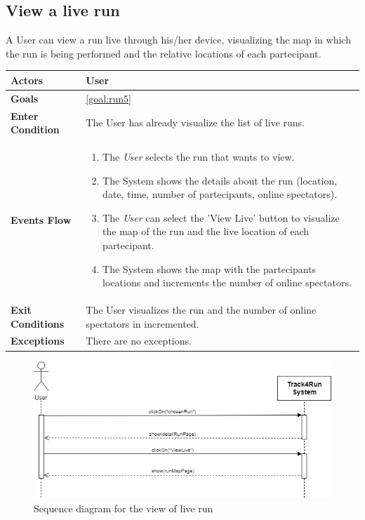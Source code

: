   \subsection{View a live run}
A User can view a run live through his/her device, visualizing the map in which the run is being performed and the relative locations of each partecipant.

\begin{table}[H]
	\centering
    
    \begin{tabular}{|p{3.5cm}|p{10.3cm}|}
    
    \hline
    \textbf{\large{Actors}} & User \\		 			
    \hline
    \textbf{\large{Goals}} 				& \ref{goal:run5}\\
    
    \hline
    \textbf{\large{Enter Condition}}	& The User has already visualize the list of live runs.\\
    
    \hline
    \textbf{\large{Events Flow}}		& \begin{enumerate}[leftmargin=0.5cm]
                                          	\item The \emph{User}  selects the run that wants to view.
                                            \item The System shows the details about the run (location, date, time, number of partecipants, online spectators).
                                             \item The \emph{User} can select the 'View Live' button to visualize the map of the run and the live location of each partecipant.
                                            \item The System shows the map with the partecipants locations and increments the number of online spectators.
                                           
                                          \end{enumerate}
    										\\
    \hline
    \textbf{\large{Exit Conditions}}    & The User visualizes the run and the number of online spectators in incremented.  \\
    
    \hline
    \textbf{\large{Exceptions}} 		& There are no exceptions. \\
    
    \hline
    
    
    \end{tabular}
	
\end{table}

\begin{figure}[H]
    \centering
    \includegraphics[scale=0.4]{Pictures/viewLiveRun.png}
    \caption{Sequence diagram for the view of live run}
\end{figure}
